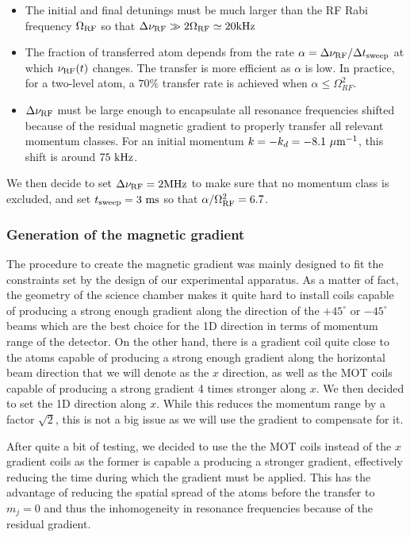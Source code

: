 \begin{itemize}
    \item The initial and final detunings must be much larger than the RF Rabi frequency $\Omega_{\rm{RF}}$ so that $\Delta \nu_{\rm{RF}} \gg 2 \Omega_{\rm{RF}} \simeq 20 \rm{kHz}$
    \item The fraction of transferred atom depends from the rate $\alpha = \Delta \nu_{\rm{RF}}/ \Delta t_{\rm{sweep}}$ at which $\nu_{\rm{RF}}(t)$ changes. The transfer is more efficient as $\alpha$ is low. In practice, for a two-level atom, a $70 \%$ transfer rate is achieved when $\alpha \leq \Omega_{RF}^2$.
    \item $\Delta \nu_{\rm{RF}}$ must be large enough to encapsulate all resonance frequencies shifted because of the residual magnetic gradient to properly transfer all relevant momentum classes. For an initial momentum $k=-k_d=-8.1 \ \mu \rm{m}^{-1}$, this shift is around $75 \ \rm{kHz}$.
\end{itemize}

We then decide to set $\Delta \nu_{\rm{RF}}=2 \rm{MHz}$ to make sure that no momentum class is excluded, and set $t_{\rm{sweep}}=3 \ \rm{ms}$ so that $\alpha/\Omega^2_{\rm{RF}}=6.7$. 

\subsubsection{Generation of the magnetic gradient}

The procedure to create the magnetic gradient was mainly designed to fit the constraints set by the design of our experimental apparatus. As a matter of fact, the geometry of the science chamber makes it quite hard to install coils capable of producing a strong enough gradient along the direction of the $+45^{\circ}$ or $-45^{\circ}$ beams which are the best choice for the 1D direction in terms of momentum range of the detector. On the other hand, there is a gradient coil quite close to the atoms capable of producing a strong enough gradient along the horizontal beam direction that we will denote as the $x$ direction, as well as the MOT coils capable of producing a strong gradient 4 times stronger along $x$. We then decided to set the 1D direction along $x$. While this reduces the momentum range by a factor $\sqrt{2}$, this is not a big issue as we will use the gradient to compensate for it. 

After quite a bit of testing, we decided to use the the MOT coils instead of the $x$ gradient coils as the former is capable a producing a stronger gradient, effectively reducing the time during which the gradient must be applied. This has the advantage of reducing the spatial spread of the atoms before the transfer to $m_j=0$ and thus the inhomogeneity in resonance frequencies because of the residual gradient.  

